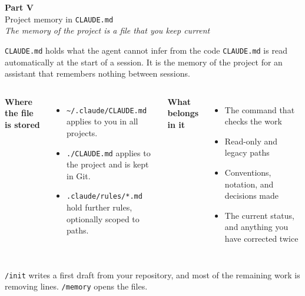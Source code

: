 \documentclass[aspectratio=169,10pt]{beamer}
\newcommand{\emphc}[1]{\textcolor{harvardcrimson}{#1}}
\newcommand{\partcard}[3]{%
  \begin{frame}{}\vfill\begin{center}
  {\Huge \textcolor{uzhblue}{\textbf{Part #1}}}\\[12pt]{\LARGE #2}\\[14pt]{\large\textcolor{uzhgreydark}{\itshape #3}}
  \end{center}\vfill\end{frame}}
\begin{document}
\partcard{V}{Project memory in \texttt{CLAUDE.md}}{The memory of the project is a file that you keep current}

\begin{frame}{\texttt{CLAUDE.md} holds what the agent cannot infer from the code}
\texttt{CLAUDE.md} is read \emphc{automatically} at the start of a session. It is the memory of the project for an assistant that remembers nothing between sessions.

\vspace{0.9em}
\begin{columns}[T]
\textbf{Where the file is stored}
\begin{itemize}\itemsep5pt
  \item \texttt{\textasciitilde/.claude/CLAUDE.md} applies to you in all projects.
  \item \texttt{./CLAUDE.md} applies to the project and is kept in Git.
  \item \texttt{.claude/rules/*.md} hold further rules, optionally scoped to paths.
\end{itemize}
\textbf{What belongs in it}
\begin{itemize}\itemsep5pt
  \item The command that checks the work
  \item Read-only and legacy paths
  \item Conventions, notation, and decisions made
  \item The current status, and anything you have corrected twice
\end{itemize}
\end{columns}

\vspace{0.9em}
{\small\textcolor{uzhgreydark}{\texttt{/init} writes a first draft from your repository, and most of the remaining work is removing lines. \texttt{/memory} opens the files.}}
\end{frame}
\end{document}
